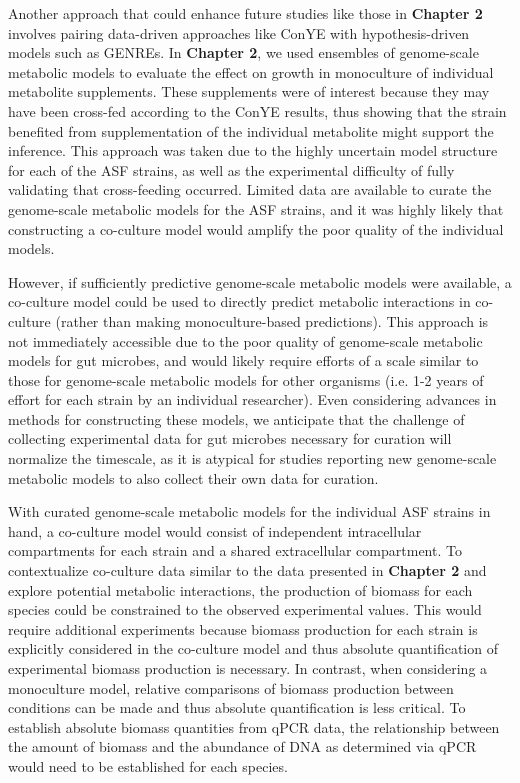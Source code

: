 \documentclass[11pt,twocolumn,notitlepage,openany,twoside]{book}
\begin{document}
\begin{refsection}
Another approach that could enhance future studies like those in \textbf{Chapter 2} involves pairing data-driven approaches like ConYE with hypothesis-driven models such as GENREs. In \textbf{Chapter 2}, we used ensembles of genome-scale metabolic models to evaluate the effect on growth in monoculture of individual metabolite supplements. These supplements were of interest because they may have been cross-fed according to the ConYE results, thus showing that the strain benefited from supplementation of the individual metabolite might support the inference. This approach was taken due to the highly uncertain model structure for each of the ASF strains, as well as the experimental difficulty of fully validating that cross-feeding occurred. Limited data are available to curate the genome-scale metabolic models for the ASF strains, and it was highly likely that constructing a co-culture model would amplify the poor quality of the individual models.

However, if sufficiently predictive genome-scale metabolic models were available, a co-culture model could be used to directly predict metabolic interactions in co-culture (rather than making monoculture-based predictions). This approach is not immediately accessible due to the poor quality of genome-scale metabolic models for gut microbes, and would likely require efforts of a scale similar to those for genome-scale metabolic models for other organisms (i.e. 1-2 years of effort for each strain by an individual researcher). Even considering advances in methods for constructing these models, we anticipate that the challenge of collecting experimental data for gut microbes necessary for curation will normalize the timescale, as it is atypical for studies reporting new genome-scale metabolic models to also collect their own data for curation.

With curated genome-scale metabolic models for the individual ASF strains in hand, a co-culture model would consist of independent intracellular compartments for each strain and a shared extracellular compartment. To contextualize co-culture data similar to the data presented in \textbf{Chapter 2} and explore potential metabolic interactions, the production of biomass for each species could be constrained to the observed experimental values. This would require additional experiments because biomass production for each strain is explicitly considered in the co-culture model and thus absolute quantification of experimental biomass production is necessary. In contrast, when considering a monoculture model, relative comparisons of biomass production between conditions can be made and thus absolute quantification is less critical. To establish absolute biomass quantities from qPCR data, the relationship between the amount of biomass and the abundance of DNA as determined via qPCR would need to be established for each species.


\end{refsection}
\end{document}
